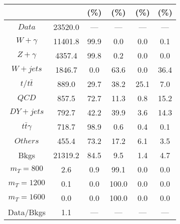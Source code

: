 \begin{figure}
\begin{minipage}[c]{0.32\textwidth}
{\begin{tabular}{cccccc}
 &  & (\%) & (\%) & (\%) & (\%)  \\
\hline
                                                                      $ Data $ &  23520.0 &  --- &  --- &  --- &  ---\\
$ W+\gamma $ &  11401.8 &  99.9 &  0.0 &  0.0 &  0.1\\
$ Z+\gamma $ &  4357.4 &  99.8 &  0.2 &  0.0 &  0.0\\
$ W+jets $ &  1846.7 &  0.0 &  63.6 &  0.0 &  36.4\\
$ t/t\bar{t} $ &  889.0 &  29.7 &  38.2 &  25.1 &  7.0\\
$ QCD $ &  857.5 &  72.7 &  11.3 &  0.8 &  15.2\\
$ DY+jets $ &  792.7 &  42.2 &  39.9 &  3.6 &  14.3\\
$ t\bar{t}\gamma $ &  718.7 &  98.9 &  0.6 &  0.4 &  0.1\\
$ Others $ &  455.4 &  73.2 &  17.2 &  6.1 &  3.5\\
Bkgs &  21319.2 &  84.5 &  9.5 &  1.4 &  4.7\\
$ m_{T} = 800 $ &  2.6 &  0.9 &  99.1 &  0.0 &  0.0\\
$ m_{T} = 1200 $ &  0.1 &  0.0 &  100.0 &  0.0 &  0.0\\
$ m_{T} = 1600 $ &  0.0 &  0.0 &  100.0 &  0.0 &  0.0\\
Data/Bkgs &  1.1 &  --- &  --- &  --- &  ---\\
\hline
\end{tabular}
}
\end{minipage}
\end{figure}

